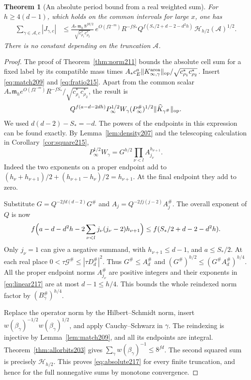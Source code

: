 \documentclass[a4paper,11pt]{article}
\newtheorem{theorem}[proposition]{Theorem}
\theoremstyle{definition}
\theoremstyle{remark}
\numberwithin{equation}{section}
\begin{document}
\begin{theorem}[An absolute period bound from a real weighted sum]
\label{thm:moment217}
For \(h\ge4(d-1)\), which holds on the common intervals for
large \(x\), one has
\begin{align}
 \sum_{\gamma\in\mathcal A,c}|J_{\gamma,c}|
 &\le
 \frac{A_*\,\mathfrak m_h\,8^{fd/2}}{\sqrt{c_{\rho_1}^*c_{\rho_2}^*}}\,
  e^{O(f2^{-m})} R^{-fS_*}
   Q^{f(S_*/2+d-2-d^2h)}\,
      \mathcal H_{h/2}(\mathcal A)^{1/2}.              \label{eq:absolute217}
\end{align}
There is no constant depending on the truncation \(\mathcal A\).
\end{theorem}
\begin{proof}
The proof of Theorem~\ref{thm:norm211} bounds the absolute cell
sum for a fixed label by its compatible mass times
\(A_*c_E^a\|K_{\infty,\gamma}^{\rm area}\|_{\rm op}
 /\sqrt{c_{\rho_1}^*c_{\rho_2}^*}\).
Insert \eqref{eq:match209} and \eqref{eq:fratio215}. Apart from
the common scalar
\(A_*\mathfrak m_h e^{O(f2^{-m})}R^{-fS_*}/
\sqrt{c_{\rho_1}^*c_{\rho_2}^*}\), the result is
\[
 Q^{f(a-d-2dh)} P_\infty^{1/2}W_\gamma
                 (P_\infty^\#)^{1/2}\|\widehat K_{\gamma^\#}\|_{\rm op}.
\]
We used \(d(d-2)-S_*=-d\). The powers of the endpoints in this
expression can be found exactly. By Lemma~\ref{lem:density207}
and the telescoping calculation in Corollary~\ref{cor:square215},
\begin{equation}
       P_\infty^{1/2}W_\gamma
             =G^{h/2}\prod_{\nu<l}A_{j_\nu}^{h_{\nu+1}} .
       \label{eq:linear217}
\end{equation}
Indeed the two exponents on a proper endpoint add to
\((h_\nu+h_{\nu+1})/2+(h_{\nu+1}-h_\nu)/2=h_{\nu+1}\).
At the final endpoint they add to zero.

Substitute \(G=Q^{-2fd(d-2)}G^\#\) and
\(A_j=Q^{-2fj(j-2)}A_j^\#\). The overall exponent of \(Q\) is
now
\[
 f\Bigl(a-d-d^2h-2\sum_{\nu<l}j_\nu(j_\nu-2)h_{\nu+1}\Bigr)
 \le f(S_*/2+d-2-d^2h).
\]
Only \(j_\nu=1\) can give a negative summand, with
\(h_{\nu+1}\le d-1\), and \(a\le S_*/2\).
At each real place
\(0<\tau\mathcal G^\#\le|\tau D_d^\#|^2\). Thus \(G^\#\le A_d^\#\)
and \((G^\#)^{h/2}\le(G^\# A_d^\#)^{h/4}\).
All the proper endpoint norms \(A_{j_\nu}^\#\) are positive
integers and their exponents in \eqref{eq:linear217} are at
most \(d-1\le h/4\). This bounds the whole reindexed norm
factor by \((B_\gamma^\#)^{h/4}\).

Replace the operator norm by the Hilbert--Schmidt norm, insert
\(w(\beta_\gamma)^{-1/2}w(\beta_\gamma)^{1/2}\), and apply
Cauchy--Schwarz in \(\gamma\). The reindexing is injective
by Lemma~\ref{lem:match209}, and all its endpoints are integral.
Theorem~\ref{thm:allorbits203} gives
\(\sum_\gamma w(\beta_\gamma)^{-1}\le8^{fd}\).
The second squared sum is precisely \(\mathcal H_{h/2}\).
This proves \eqref{eq:absolute217} for every finite truncation,
and hence for the full nonnegative sums by monotone convergence.
\end{proof}
\end{document}
